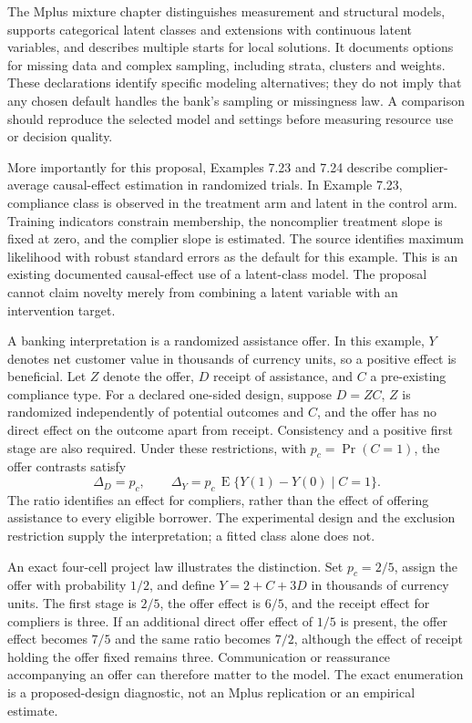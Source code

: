 The Mplus mixture chapter distinguishes measurement and structural
models, supports categorical latent classes and extensions with
continuous latent variables, and describes multiple starts for local
solutions. It documents options for missing data and complex sampling,
including strata, clusters and weights. These declarations identify
specific modeling alternatives; they do not imply that any chosen
default handles the bank's sampling or missingness law. A comparison
should reproduce the selected model and settings before measuring
resource use or decision quality.
\citep[pp.165--171]{exec13_latent_mplus}

More importantly for this proposal, Examples 7.23 and 7.24 describe
complier-average causal-effect estimation in randomized trials. In
Example 7.23, compliance class is observed in the treatment arm and
latent in the control arm. Training indicators constrain membership, the
noncomplier treatment slope is fixed at zero, and the complier slope is
estimated. The source identifies maximum likelihood with robust standard
errors as the default for this example. This is an existing documented
causal-effect use of a latent-class model. The proposal cannot claim
novelty merely from combining a latent variable with an intervention
target. \citep[pp.203--205]{exec13_latent_mplus}

A banking interpretation is a randomized assistance offer. In this
example, \(Y\) denotes net customer value in thousands of currency
units, so a positive effect is beneficial. Let \(Z\) denote the offer,
\(D\) receipt of assistance, and \(C\) a pre-existing compliance type.
For a declared one-sided design, suppose \(D=ZC\), \(Z\) is randomized
independently of potential outcomes and \(C\), and the offer has no
direct effect on the outcome apart from receipt. Consistency and a
positive first stage are also required. Under these restrictions, with
\(p_c=\Pr(C=1)\), the offer contrasts satisfy \[
 \Delta_D=p_c,\qquad
 \Delta_Y=p_c\,\operatorname{E}\{Y(1)-Y(0)\mid C=1\}.
\] The ratio identifies an effect for compliers, rather than the effect
of offering assistance to every eligible borrower. The experimental
design and the exclusion restriction supply the interpretation; a fitted
class alone does not.

An exact four-cell project law illustrates the distinction. Set
\(p_c=2/5\), assign the offer with probability \(1/2\), and define
\(Y=2+C+3D\) in thousands of currency units. The first stage is \(2/5\),
the offer effect is \(6/5\), and the receipt effect for compliers is
three. If an additional direct offer effect of \(1/5\) is present, the
offer effect becomes \(7/5\) and the same ratio becomes \(7/2\),
although the effect of receipt holding the offer fixed remains three.
Communication or reassurance accompanying an offer can therefore matter
to the model. The exact enumeration is a proposed-design diagnostic, not
an Mplus replication or an empirical estimate.
\citep{exec13_latent_examples}

